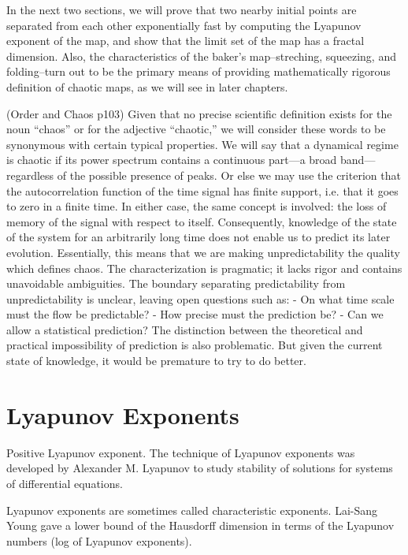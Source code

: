 \documentclass[12pt,twoside,draft]{book}
\begin{document}
In the next two sections, we will prove that two nearby initial points are separated from each other exponentially fast by computing the Lyapunov exponent of the map, and show that the limit set of the map has a fractal dimension.
Also, the characteristics of the baker's map--streching, squeezing, and folding--turn out to be the primary means of providing mathematically rigorous definition of chaotic maps, as we will see in later chapters.

(Order and Chaos p103)
Given that no precise scientific definition exists for the noun ``chaos'' or for the adjective ``chaotic,'' we will consider these words to be synonymous with certain typical properties.
We will say that a dynamical regime is chaotic if its power spectrum contains a continuous part---a broad band---regardless of the possible presence of peaks.
Or else we may use the criterion that the autocorrelation function of the time signal has finite support, i.e. that it goes to zero in a finite time.
In either case, the same concept is involved: the loss of memory of the signal with respect to itself.
Consequently, knowledge of the state of the system for an arbitrarily long time does not enable us to predict its later evolution.
Essentially, this means that we are making unpredictability the quality which defines chaos.
The characterization is pragmatic; it lacks rigor and contains unavoidable ambiguities.
The boundary separating predictability from unpredictability is unclear, leaving open questions such as:
- On what time scale must the flow be predictable?
- How precise must the prediction be?
- Can we allow a statistical prediction?
The distinction between the theoretical and practical impossibility of prediction is also problematic.
But given the current state of knowledge, it would be premature to try to do better.

\section{Lyapunov Exponents}
Positive Lyapunov exponent.\citet{kantz-schreiber} 
The technique of Lyapunov exponents was developed by Alexander M. Lyapunov to study stability of solutions for systems of differential equations.

Lyapunov exponents are sometimes called characteristic exponents.
Lai-Sang Young gave a lower bound of the Hausdorff dimension in terms of the Lyapunov numbers (log of Lyapunov exponents).
\end{document}
